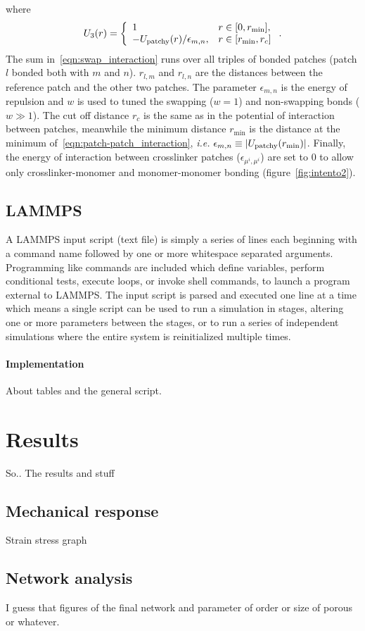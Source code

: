 where
\begin{gather}
    U_{3}\qty(r) = \left\{
        \begin{array}{ll}
            1 & r\in\qty[0,r_{\min}], \\
            -U_{\mathrm{patchy}}\qty(r)/\epsilon_{m,n}, & r\in\qty[r_{\min},r_c]
        \end{array}
        \right.\label{eqn:swapmod_interaction}.
\end{gather}
The sum in~\eqref{eqn:swap_interaction} runs over all triples of bonded patches (patch $l$ bonded both with $m$ and $n$).
$r_{l,m}$ and $r_{l,n}$ are the distances between the reference patch and the other two patches.
The parameter $\epsilon_{m,n}$ is the energy of repulsion and $w$ is used to tuned the swapping ($w=1$) and non-swapping bonds ($w\gg1$). 
The cut off distance $r_c$ is the same as in the potential of interaction between patches, meanwhile the minimum distance $r_{\min}$ is the distance at the minimum of~\eqref{eqn:patch-patch_interaction}, \textit{i.e.} $\epsilon_{m,n}\equiv\abs{U_{\mathrm{patchy}}(r_{\min})}$.
Finally, the energy of interaction between crosslinker patches ($\epsilon_{\mu^i,\mu^i}$) are set to $0$ to allow only crosslinker-monomer and monomer-monomer bonding (figure~\ref{fig:intento2}).

\subsection{LAMMPS}

A LAMMPS input script (text file) is simply a series of lines each beginning with a command name followed by one or more whitespace separated arguments. 
Programming like commands are included which define variables, perform conditional tests, execute loops, or invoke shell commands, to launch a program external to LAMMPS.
The input script is parsed and executed one line at a time which means a single script can be used to run a simulation in stages, altering one or more parameters between the stages, or to run a series of independent simulations where the entire system is reinitialized multiple times.



\paragraph{Implementation} About tables and the general script.


\section{Results}

So.. The results and stuff

\subsection{Mechanical response}

Strain stress graph

\subsection{Network analysis}

I guess that figures of the final network and parameter of order or size of porous or whatever.

